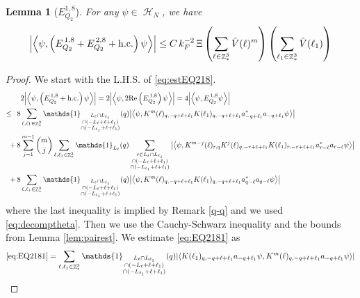 \documentclass[sn-mathphys, Numbered ,a4paper]{sn-jnl}%
\DeclareMathOperator{\Z}{\mathbb{Z}}
\DeclareMathOperator{\HH}{\mathcal{H}}
\newcommand{\eva}[1]{\left\langle #1 \right\rangle}
\theoremstyle{plain}
\newtheorem{lemma}[theorem]{Lemma}
\theoremstyle{definition}
\theoremstyle{remark}
\theoremstyle{plain}
\theoremstyle{definition}
\theoremstyle{remark}
\begin{document}
\begin{lemma}[$E_{Q_2}^{1,8}$]
	For any $\psi \in \HH_N$, we have
	\begin{alignat}{2}
		\abs{\eva{\psi,\left(E^{\,1,8}_{Q_2}+E^{\,2,8}_{Q_2}+\mathrm{h.c.}\right) \psi }}
		\leq  C\, k_{F}^{-2}\, \Xi \left(\sum\limits_{\ell \in \Z^3_*} \hat{V}(\ell)^m \right) \left(\sum\limits_{\ell_1 \in \Z^3_*} \hat{V}(\ell_1) \right) \label{eq:estEQ218}  
	\end{alignat}
\end{lemma}
\begin{proof}
 We start with the L.H.S. of \eqref{eq:estEQ218}.
\begin{align}
	&2\abs{\eva{\psi,\left(E^{\,1,8}_{Q_2}+\mathrm{h.c.}\right) \psi }} = 2\abs{\eva{\psi,2\mathrm{Re}\left(E^{\,1,8}_{Q_2}\right) \psi }} = 4\abs{\eva{\psi, E^{\,1,8}_{Q_2} \psi }}\nonumber\\
	\leq\,\;8& \sum\limits_{\ell, \ell_1\in \Z^3_*} \mathds{1}_{\substack{L_{\ell}\cap L_{\ell_1}\\\cap (-L_{\ell}+\ell+\ell_1) \\ \cap (-L_{\ell_1}+\ell+\ell_1)}}(q) \abs{\eva{\psi, K^m(\ell)_{q,-q+\ell+\ell_1} K(\ell_1)_{q,-q+\ell+\ell_1} a^*_{-q+\ell_1}a_{-q+\ell_1} \psi }} \label{eq:EQ2181}\\
	+\,8& \sum\limits_{j=1}^{m-1} {{m}\choose j} \sum\limits_{\ell, \ell_1\in \Z^3_*}\mathds{1}_{L_{\ell}}(q) \sum\limits_{\substack{r\in L_{\ell} \cap L_{\ell_1}\\\cap (-L_{\ell}+\ell+\ell_1) \\ \cap (-L_{\ell_1}+\ell+\ell_1)}}  \abs{\eva{\psi, K^{m-j}(\ell)_{r,q} K^j(\ell)_{q,-r+\ell+\ell_1} K(\ell_1)_{r,-r+\ell+\ell_1} a^*_{r-\ell}a_{r-\ell} \psi }} \label{eq:EQ2182}\\
	+\,8&\sum\limits_{\ell, \ell_1\in \Z^3_*} \mathds{1}_{\substack{L_{\ell}\cap L_{\ell_1}\\\cap (-L_{\ell}+\ell+\ell_1) \\ \cap (-L_{\ell_1}+\ell+\ell_1)}} (q) \abs{\eva{\psi, K^m(\ell)_{q,-q+\ell+\ell_1}K(\ell_1)_{q,-q+\ell+\ell_1} a^*_{q-\ell}a_{q-\ell}\psi }} \label{eq:EQ2183}
\end{align}
where the last inequality is implied by Remark \ref{q-q} and we used \eqref{eq:decomptheta}. Then we use the Cauchy-Schwarz inequality and the bounds from Lemma \ref{lem:pairest}.
We estimate \eqref{eq:EQ2181} as 
\begin{align}
	 \eqref{eq:EQ2181}
	&= \sum\limits_{\ell, \ell_1\in \Z^3_*} \mathds{1}_{\substack{L_{\ell}\cap L_{\ell_1}\\\cap (-L_{\ell}+\ell+\ell_1) \\ \cap (-L_{\ell_1}+\ell+\ell_1)}}(q) \abs{\eva{ K(\ell_1)_{q,-q+\ell+\ell_1} a_{-q+\ell_1} \psi, K^m(\ell)_{q,-q+\ell+\ell_1} a_{-q+\ell_1} \psi }}\nonumber\\

\end{align}
\end{proof}
\end{document}
